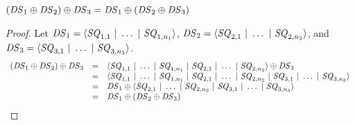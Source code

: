 \documentclass[acmsmall]{acmart}
\begin{document}
\begin{lemma}
  \label{lem:dnf-or-assoc}
  $(\mathit{DS}_1 \oplus \mathit{DS}_2) \oplus \mathit{DS}_3 =
  \mathit{DS}_1 \oplus (\mathit{DS}_2 \oplus \mathit{DS}_3)$
\end{lemma}
\begin{proof}
  Let $\mathit{DS}_1 = \langle\mathit{SQ}_{1,1} ~|~ \ldots ~|~ \mathit{SQ}_{1,n_1}\rangle$,
  $\mathit{DS}_2 = \langle\mathit{SQ}_{2,1} ~|~ \ldots ~|~ \mathit{SQ}_{2,n_2}\rangle$, and
  $\mathit{DS}_3 = \langle\mathit{SQ}_{3,1} ~|~ \ldots ~|~ \mathit{SQ}_{3,n_3}\rangle$.
  \[
    \begin{array}{rcl}
      (\mathit{DS}_1 \oplus \mathit{DS}_2) \oplus \mathit{DS}_3
      & = & \langle\mathit{SQ}_{1,1} ~|~ \ldots ~|~ \mathit{SQ}_{1,n_1} ~|~ 
            \mathit{SQ}_{2,1} ~|~ \ldots ~|~ \mathit{SQ}_{2,n_2}\rangle \oplus \mathit{DS}_3\\
      & = & \langle\mathit{SQ}_{1,1} ~|~ \ldots ~|~ \mathit{SQ}_{1,n_1} ~|~ 
            \mathit{SQ}_{2,1} ~|~ \ldots ~|~ \mathit{SQ}_{2,n_2} ~|~ 
            \mathit{SQ}_{3,1} ~|~ \ldots ~|~ \mathit{SQ}_{3,n_3}\rangle\\
      & = & \mathit{DS}_1 \oplus
            \langle\mathit{SQ}_{2,1} ~|~ \ldots ~|~ \mathit{SQ}_{2,n_2} ~|~ 
            \mathit{SQ}_{3,1} ~|~ \ldots ~|~ \mathit{SQ}_{3,n_3}\rangle\\
      & = & \mathit{DS}_1 \oplus (\mathit{DS}_2 \oplus \mathit{DS}_3)
    \end{array}
  \]
\end{proof}
\end{document}
